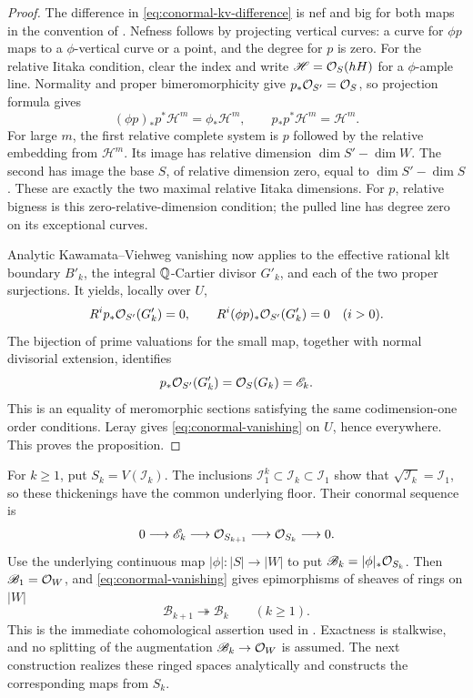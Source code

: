 \begin{proof}
The difference in \eqref{eq:conormal-kv-difference} is nef and big for
both maps in the convention of
\cite[Definition~2.40]{DasHaconPaun2024}.  Nefness follows by projecting
vertical curves: a curve for \(\phi p\) maps to a \(\phi\)-vertical
curve or a point, and the degree for \(p\) is zero.  For the relative
Iitaka condition, clear the index and write \(\mathscr H=\mathcal O_S(hH)\)
for a \(\phi\)-ample line.  Normality and proper bimeromorphicity give
\(p_*\mathcal O_{S'}=\mathcal O_S\), so projection formula gives
\[
 (\phi p)_*p^*\mathscr H^m=\phi_*\mathscr H^m,\qquad
 p_*p^*\mathscr H^m=\mathscr H^m .
\]
For large \(m\), the first relative complete system is \(p\) followed
by the relative embedding from \(\mathscr H^m\).  Its image has relative
dimension \(\dim S'-\dim W\).  The second has image the base \(S\), of
relative dimension zero, equal to \(\dim S'-\dim S\).  These are exactly
the two maximal relative Iitaka dimensions.  For \(p\), relative bigness
is this zero-relative-dimension condition; the pulled line has degree zero
on its exceptional curves.

Analytic Kawamata--Viehweg vanishing
\cite[Theorem~2.41]{DasHaconPaun2024} now applies to the effective
rational klt boundary \(B'_k\), the integral \(\mathbb Q\)-Cartier divisor
\(G'_k\), and each of the two proper surjections.  It yields, locally
over \(U\),
\[
 R^ip_*\mathcal O_{S'}(G'_k)=0,\qquad
 R^i(\phi p)_*\mathcal O_{S'}(G'_k)=0\quad(i>0).
\]
The bijection of prime valuations for the small map, together with
normal divisorial extension, identifies
\[
 p_*\mathcal O_{S'}(G'_k)=\mathcal O_S(G_k)=\mathscr E_k .
\]
This is an equality of meromorphic sections satisfying the same
codimension-one order conditions.  Leray gives
\eqref{eq:conormal-vanishing} on \(U\), hence everywhere.  This proves
the proposition.
\end{proof}

For \(k\geq1\), put \(S_k=V(\mathscr I_k)\).  The inclusions
\(\mathscr I_1^k\subset\mathscr I_k\subset\mathscr I_1\) show that
\(\sqrt{\mathscr I_k}=\mathscr I_1\), so these thickenings have the
common underlying floor.  Their conormal sequence is
\[
 0\longrightarrow\mathscr E_k\longrightarrow\mathcal O_{S_{k+1}}
 \longrightarrow\mathcal O_{S_k}\longrightarrow0 .
\]
Use the underlying continuous map \(|\phi|:|S|\to|W|\) to put
\(\mathscr B_k=|\phi|_*\mathcal O_{S_k}\).  Then
\(\mathscr B_1=\mathcal O_W\), and \eqref{eq:conormal-vanishing} gives
epimorphisms of sheaves of rings on \(|W|\)
\begin{equation}\label{eq:thickening-ring-surjection}
 \mathscr B_{k+1}\twoheadrightarrow\mathscr B_k\qquad(k\geq1).
\end{equation}
This is the immediate cohomological assertion used in
\cite[Claim~5.9]{DasHacon2024OnMMP}.  Exactness is stalkwise, and no
splitting of the augmentation \(\mathscr B_k\to\mathcal O_W\) is assumed.
The next construction realizes these ringed spaces analytically and
constructs the corresponding maps from \(S_k\).

